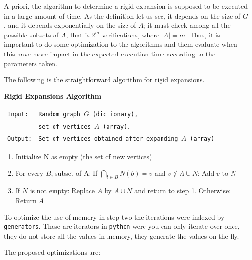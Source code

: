 A priori, the algorithm to determine a rigid expansion is supposed to be executed in a large amount of time. As the definition let us see, it depends on the size of $ G $, and it depends exponentially on the size of $A$; it must check among all the possible subsets of $ A $, that is $ 2 ^ {m} $ verifications, where $ | A | = m $. Thus, it is important to do some optimization to the algorithms and them evaluate when this have more impact in the expected execution time according to the parameters taken.

The following is the straightforward algorithm for rigid expansions.

\begin{cajita}
\textbf{Rigid Expansions Algorithm} \hfill \break

\begin{tabular}{ l l }
\texttt{Input:} &  \texttt{Random graph $G$ (dictionary),} \\
                &  \texttt{set of vertices $A$ (array).}\\
\texttt{Output:} & \texttt{Set of vertices obtained after expanding $A$ (array)} \\
\end{tabular}
\begin{enumerate}
\item Initialize N as empty (the set of new vertices)
\item For every $B$, subset of A:\hfill \break
\hphantom{12} If $\bigcap\limits_{b\in B} N(b) = v$ and $v\not\in A\cup N$: \hfill \break
\hphantom{1234} Add $v$ to $N$
\item If $N$ is not empty: \hfill \break
\hphantom{12} Replace $A$ by $A\cup N$ and return to step 1. \hfill \break
      Otherwise:\hfill \break
\hphantom{12} Return $A$
\end{enumerate}
\end{cajita}

To optimize the use of memory in step two the iterations were indexed by \texttt{generators}. These are iterators in \texttt{python} were you can only iterate over once, they do not store all the values in memory, they generate the values on the fly.

The proposed optimizations are:

